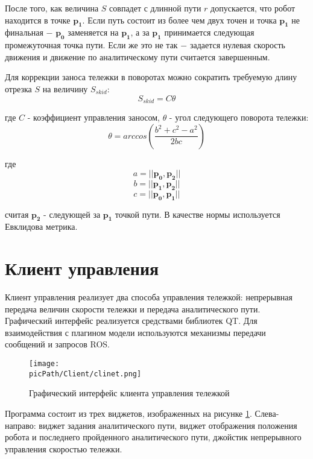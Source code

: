 \documentclass[oneside,final,14pt]{extreport}
\newcommand{\picPath}{img}
\newcommand{\bs}{\boldsymbol}
\begin{document}
После того, как величина $S$ совпадет с длинной пути $r$ допускается, что робот находится в точке $\bs{p_1}$.  Если путь состоит из более чем двух точен и точка $\bs{p_1}$ не финальная $-$ $\bs{p_0}$ заменяется на $\bs{p_1}$, а за  $\bs{p_1}$ принимается следующая промежуточная точка пути. Если же это не так $-$ задается нулевая скорость движения и движение по аналитическому пути считается завершенным.

Для коррекции заноса тележки в поворотах можно сократить требуемую длину отрезка $S$ на величину $S_{skid}$:
\begin{equation}
S_{skid}
=
C
\theta
\end{equation}

где $C$ - коэффициент управления заносом, $\theta$ - угол следующего поворота тележки:
\begin{equation}
\theta
=
arccos
(
\frac{b^2 + c^2 - a^2}{2bc}
)
\end{equation}

где 
\begin{equation}
a = ||\bs{p_0},\bs{p_2}||
\end{equation}
\begin{equation}
b = ||\bs{p_1},\bs{p_2}||
\end{equation}
\begin{equation}
c = ||\bs{p_0},\bs{p_1}||
\end{equation}

считая $\bs{p_2}$ - следующей за $\bs{p_1}$ точкой пути. В качестве нормы используется Евклидова метрика.
\section{ Клиент управления } 

Клиент управления реализует два способа управления тележкой: непрерывная передача величин скорости тележки и передача аналитического пути. Графический интерфейс реализуется средствами библиотек QT. Для взаимодействия с плагином модели используются механизмы передачи сообщений и запросов ROS.

\begin{figure}[H]
\begin{center}
\texttt{[image: \\picPath/Client/clinet.png]}
\end{center}
  \caption{ Графический интерфейс клиента управления тележкой }
  \label{Figure:client}
\end{figure}

Программа состоит из трех виджетов, изображенных на рисунке \ref{Figure:client}. Слева-направо: виджет задания аналитического пути, виджет отображения положения робота и последнего пройденного аналитического пути, джойстик непрерывного управления скоростью тележки.   
\end{document}
